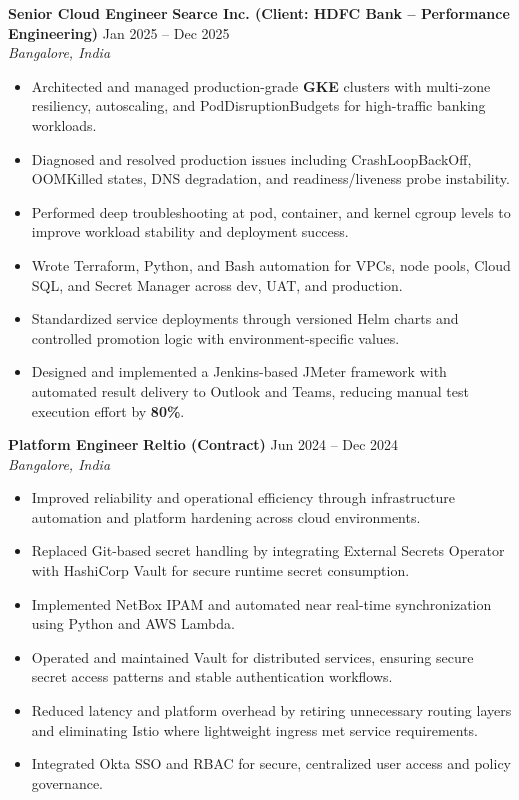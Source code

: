 \documentclass[a4paper,10pt]{article}
\newcommand{\role}[4]{%
  \noindent\textbf{#1} \textbar{} \textbf{#2} \hfill #3\\
  \textit{#4}\vspace{1pt}
}
\begin{document}
\begin{samepage}
\role{Senior Cloud Engineer}{Searce Inc. (Client: HDFC Bank -- Performance Engineering)}{Jan 2025 -- Dec 2025}{Bangalore, India}
\begin{itemize}
    \item Architected and managed production-grade \textbf{GKE} clusters with multi-zone resiliency, autoscaling, and PodDisruptionBudgets for high-traffic banking workloads.
    \item Diagnosed and resolved production issues including CrashLoopBackOff, OOMKilled states, DNS degradation, and readiness/liveness probe instability.
    \item Performed deep troubleshooting at pod, container, and kernel cgroup levels to improve workload stability and deployment success.
    \item Wrote Terraform, Python, and Bash automation for VPCs, node pools, Cloud SQL, and Secret Manager across dev, UAT, and production.
    \item Standardized service deployments through versioned Helm charts and controlled promotion logic with environment-specific values.
    \item Designed and implemented a Jenkins-based JMeter framework with automated result delivery to Outlook and Teams, reducing manual test execution effort by \textbf{80\%}.
\end{itemize}
\end{samepage}

\begin{samepage}
\role{Platform Engineer}{Reltio (Contract)}{Jun 2024 -- Dec 2024}{Bangalore, India}
\begin{itemize}
    \item Improved reliability and operational efficiency through infrastructure automation and platform hardening across cloud environments.
    \item Replaced Git-based secret handling by integrating External Secrets Operator with HashiCorp Vault for secure runtime secret consumption.
    \item Implemented NetBox IPAM and automated near real-time synchronization using Python and AWS Lambda.
    \item Operated and maintained Vault for distributed services, ensuring secure secret access patterns and stable authentication workflows.
    \item Reduced latency and platform overhead by retiring unnecessary routing layers and eliminating Istio where lightweight ingress met service requirements.
    \item Integrated Okta SSO and RBAC for secure, centralized user access and policy governance.
\end{itemize}
\end{samepage}
\end{document}
